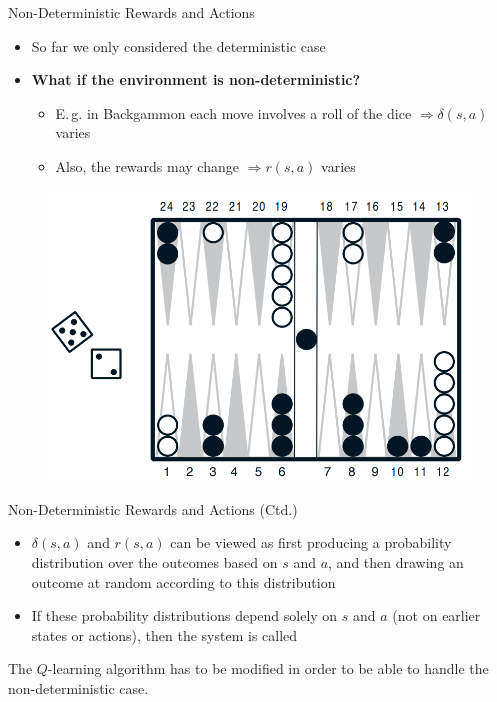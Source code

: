 \begin{frame}{Non-Deterministic Rewards and Actions}{}
	\begin{itemize}
		\item So far we only considered the deterministic case
		\item \textbf{What if the environment is non-deterministic?}
		\begin{itemize}
			\item E.\,g. in Backgammon each move involves a roll of the dice $\Rightarrow \delta(s, a)$ varies
			\item Also, the rewards may change $\Rightarrow r(s, a)$ varies
		\end{itemize}
	\end{itemize}

	\begin{figure}
		\centering
		\includegraphics[scale=0.3]{14_rl/02_img/backgammon}
	\end{figure}
\end{frame}


\begin{frame}{Non-Deterministic Rewards and Actions (Ctd.)}{}
	\begin{itemize}
		\item $\delta(s, a)$ and $r(s, a)$ can be viewed as first producing a probability distribution over the outcomes based
			on $s$ and $a$, and then drawing an outcome at random according to this distribution
		\item If these probability distributions depend solely on $s$ and $a$ (not on earlier states or actions), then
			the system is called 
	\end{itemize}

	\begin{boxBlueNoFrame}
		The $Q$-learning algorithm has to be modified in order to be able to handle the non-deterministic case.
	\end{boxBlueNoFrame}
\end{frame}


